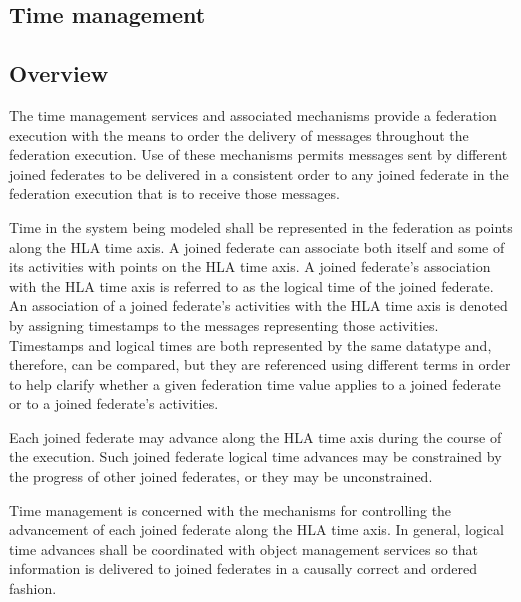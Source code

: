 
\clearpage

\begin{compactstdpage}

    \section{Time management}

    \subsection{Overview}

    The time management services and associated mechanisms provide a federation execution with the means to order the delivery of messages throughout the federation execution. Use of these mechanisms permits messages sent by different joined federates to be delivered in a consistent order to any joined federate in the federation execution that is to receive those messages.

    Time in the system being modeled shall be represented in the federation as points along the HLA time axis. A joined federate can associate both itself and some of its activities with points on the HLA time axis. A joined federate's association with the HLA time axis is referred to as the logical time of the joined federate. An association of a joined federate's activities with the HLA time axis is denoted by assigning timestamps to the messages representing those activities. Timestamps and logical times are both represented by the same datatype and, therefore, can be compared, but they are referenced using different terms in order to help clarify whether a given federation time value applies to a joined federate or to a joined federate's activities.

    Each joined federate may advance along the HLA time axis during the course of the execution. Such joined federate logical time advances may be constrained by the progress of other joined federates, or they may be unconstrained.

    Time management is concerned with the mechanisms for controlling the advancement of each joined federate along the HLA time axis. In general, logical time advances shall be coordinated with object management services so that information is delivered to joined federates in a causally correct and ordered fashion.


\end{compactstdpage}
